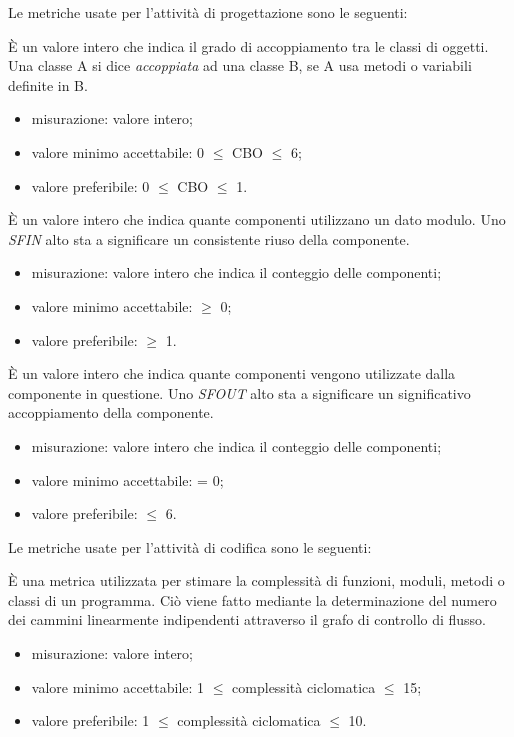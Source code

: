 		Le metriche usate per l'attività di progettazione sono le seguenti:
		
			È un valore intero che indica il grado di accoppiamento tra le classi di oggetti. Una classe A si dice \textit{accoppiata} ad una classe B, se A usa metodi o variabili definite in B.
		\begin{itemize}
			\item{misurazione: valore intero;}
			\item{valore minimo accettabile: 0 $\leq$ CBO $\leq$ 6;}
			\item{valore preferibile: 0 $\leq$ CBO $\leq$ 1.}
		\end{itemize}

		
			È un valore intero che indica quante componenti utilizzano un dato modulo. Uno \textit{SFIN} alto sta a significare un consistente riuso della componente.
		\begin{itemize}
			\item{misurazione: valore intero che indica il conteggio delle componenti;}
			\item{valore minimo accettabile: $\geq$ 0;}
			\item{valore preferibile: $\geq$ 1.}
		\end{itemize}
	
			È un valore intero che indica quante componenti vengono utilizzate dalla componente in questione. Uno \textit{SFOUT} alto sta a significare un significativo accoppiamento della componente.
		\begin{itemize}
			\item{misurazione: valore intero che indica il conteggio delle componenti;}
			\item{valore minimo accettabile: = 0;}
			\item{valore preferibile: $\leq$ 6.}
		\end{itemize}
		
		Le metriche usate per l'attività di codifica sono le seguenti:
					
		È una metrica utilizzata per stimare la complessità di funzioni, moduli, metodi o classi di un programma. Ciò viene fatto mediante la determinazione del numero dei cammini linearmente indipendenti attraverso il grafo di controllo di flusso.
		\begin{itemize}
			\item{misurazione: valore intero;}
			\item{valore minimo accettabile: 1 $\leq$ complessità ciclomatica $\leq$ 15;}
			\item{valore preferibile: 1 $\leq$ complessità ciclomatica $\leq$ 10.}
		\end{itemize}
			
